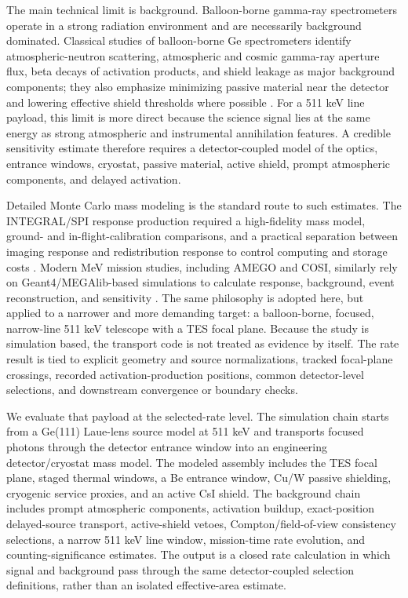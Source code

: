 \documentclass[preprint,12pt]{elsarticle}
\begin{document}
The main technical limit is background. Balloon-borne gamma-ray spectrometers operate in a strong radiation environment and are necessarily background dominated. Classical studies of balloon-borne Ge spectrometers identify atmospheric-neutron scattering, atmospheric and cosmic gamma-ray aperture flux, beta decays of activation products, and shield leakage as major background components; they also emphasize minimizing passive material near the detector and lowering effective shield thresholds where possible \cite{Gehrels1985}. For a 511 keV line payload, this limit is more direct because the science signal lies at the same energy as strong atmospheric and instrumental annihilation features. A credible sensitivity estimate therefore requires a detector-coupled model of the optics, entrance windows, cryostat, passive material, active shield, prompt atmospheric components, and delayed activation.

Detailed Monte Carlo mass modeling is the standard route to such estimates. The INTEGRAL/SPI response production required a high-fidelity mass model, ground- and in-flight-calibration comparisons, and a practical separation between imaging response and redistribution response to control computing and storage costs \cite{Sturner2003}. Modern MeV mission studies, including AMEGO and COSI, similarly rely on Geant4/MEGAlib-based simulations to calculate response, background, event reconstruction, and sensitivity \cite{Agostinelli2003,Zoglauer2006,Caputo2017,Karwin2023,Gallego2025}. The same philosophy is adopted here, but applied to a narrower and more demanding target: a balloon-borne, focused, narrow-line 511 keV telescope with a TES focal plane. Because the study is simulation based, the transport code is not treated as evidence by itself. The rate result is tied to explicit geometry and source normalizations, tracked focal-plane crossings, recorded activation-production positions, common detector-level selections, and downstream convergence or boundary checks.

We evaluate that payload at the selected-rate level. The simulation chain starts from a Ge(111) Laue-lens source model at 511 keV and transports focused photons through the detector entrance window into an engineering detector/cryostat mass model. The modeled assembly includes the TES focal plane, staged thermal windows, a Be entrance window, Cu/W passive shielding, cryogenic service proxies, and an active CsI shield. The background chain includes prompt atmospheric components, activation buildup, exact-position delayed-source transport, active-shield vetoes, Compton/field-of-view consistency selections, a narrow 511 keV line window, mission-time rate evolution, and counting-significance estimates. The output is a closed rate calculation in which signal and background pass through the same detector-coupled selection definitions, rather than an isolated effective-area estimate.
\end{document}
